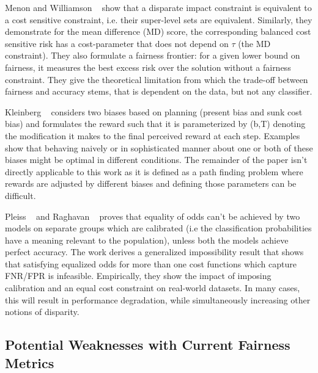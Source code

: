 Menon and Williamson ~\cite{Menon2018TheCO} show that a disparate impact constraint is equivalent to a cost sensitive
constraint, i.e. their super-level sets are equivalent.  Similarly, they demonstrate for the mean difference (MD) score, the corresponding balanced cost sensitive risk has a cost-parameter that does not depend on $\tau$ (the MD constraint). They also formulate a fairness frontier: for a given lower bound on fairness, it measures the best excess risk over the solution without a fairness constraint. They give the theoretical limitation from which the trade-off between fairness and accuracy stems, that is dependent on the data, but not any classifier.

Kleinberg ~\cite{Kleinberg2017PlanningWM} considers two biases based on planning (present bias and sunk cost bias) and formulates the reward such that it is parameterized by (b,T) denoting the modification it makes to the final perceived reward at each step. Examples show that behaving naively or in sophisticated manner about one or both of these biases might be optimal in different conditions. The remainder of the paper isn't directly applicable to this work as it is defined as a path finding problem where rewards are adjusted by different biases and defining those parameters can be difficult.

Pleiss ~\cite{Pleiss2017} and  Raghavan ~\cite{Raghavan2018TheEO} proves that equality of odds can't be achieved by two models on separate groups which are calibrated (i.e the classification probabilities have a meaning relevant to the population), unless both the models achieve perfect accuracy. The work derives a generalized impossibility result that shows that satisfying equalized odds for more than one cost functions which capture FNR/FPR is infeasible. Empirically, they show the impact of imposing calibration and an equal cost constraint on real-world datasets. In many cases, this will result in performance degradation, while simultaneously increasing other notions of disparity.

\subsection{Potential Weaknesses with Current Fairness Metrics}

